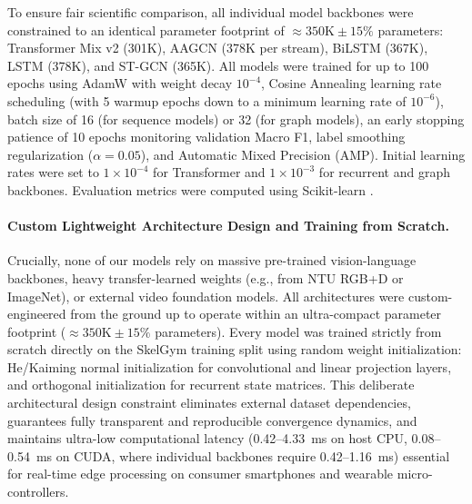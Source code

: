 \documentclass[runningheads]{llncs}
\begin{document}
To ensure fair scientific comparison, all individual model backbones were constrained to an identical parameter footprint of $\approx 350\text{K} \pm 15\%$ parameters: Transformer Mix v2 (301K), AAGCN (378K per stream), BiLSTM (367K), LSTM (378K), and ST-GCN (365K). All models were trained for up to 100 epochs using AdamW \cite{loshchilov2018} with weight decay $10^{-4}$, Cosine Annealing learning rate scheduling (with 5 warmup epochs down to a minimum learning rate of $10^{-6}$), batch size of 16 (for sequence models) or 32 (for graph models), an early stopping patience of 10 epochs monitoring validation Macro F1, label smoothing regularization \cite{szegedy2016} ($\alpha = 0.05$), and Automatic Mixed Precision (AMP). Initial learning rates were set to $1 \times 10^{-4}$ for Transformer and $1 \times 10^{-3}$ for recurrent and graph backbones. Evaluation metrics were computed using Scikit-learn \cite{pedregosa2011}.

\paragraph{Custom Lightweight Architecture Design and Training from Scratch.} Crucially, none of our models rely on massive pre-trained vision-language backbones, heavy transfer-learned weights (e.g., from NTU RGB+D or ImageNet), or external video foundation models. All architectures were custom-engineered from the ground up to operate within an ultra-compact parameter footprint ($\approx 350\text{K} \pm 15\%$ parameters). Every model was trained strictly from scratch directly on the SkelGym training split using random weight initialization: He/Kaiming normal initialization \cite{he2015delving} for convolutional and linear projection layers, and orthogonal initialization for recurrent state matrices. This deliberate architectural design constraint eliminates external dataset dependencies, guarantees fully transparent and reproducible convergence dynamics, and maintains ultra-low computational latency (0.42--4.33~ms on host CPU, 0.08--0.54~ms on CUDA, where individual backbones require 0.42--1.16~ms) essential for real-time edge processing on consumer smartphones and wearable micro-controllers.
\end{document}
